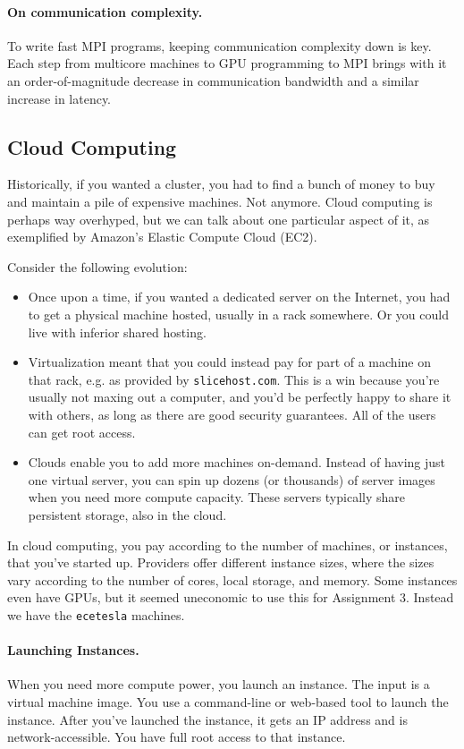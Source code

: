 \paragraph{On communication complexity.} To write fast MPI programs,
keeping communication complexity down is key. Each step from multicore
machines to GPU programming to MPI brings with it an
order-of-magnitude decrease in communication bandwidth and a similar
increase in latency.

\subsection*{Cloud Computing}
Historically, if you wanted a cluster, you had to find a bunch of
money to buy and maintain a pile of expensive machines. Not anymore.
Cloud computing is perhaps way overhyped, but we can talk about 
one particular aspect of it, as exemplified by Amazon's Elastic
Compute Cloud (EC2).

Consider the following evolution:
\begin{itemize}
\item Once upon a time, if you wanted a dedicated server on the
  Internet, you had to get a physical machine hosted, usually in a
  rack somewhere. Or you could live with inferior shared hosting.
\item Virtualization meant that you could instead pay for part of a
  machine on that rack, e.g. as provided by {\tt slicehost.com}.  This
  is a win because you're usually not maxing out a computer, and you'd
  be perfectly happy to share it with others, as long as there are
  good security guarantees. All of the users can get root access.
\item Clouds enable you to add more machines on-demand. Instead of
  having just one virtual server, you can spin up dozens (or
  thousands) of server images when you need more compute
  capacity. These servers typically share persistent storage, also in
  the cloud. 
\end{itemize}

In cloud computing, you pay according to the number of machines, or
instances, that you've started up. Providers offer different instance
sizes, where the sizes vary according to the number of cores, local
storage, and memory. Some instances even have GPUs, but it seemed 
uneconomic to use this for Assignment 3. Instead we have the {\tt ecetesla} machines.

\paragraph{Launching Instances.} When you need more compute power,
you launch an instance. The input is a virtual machine image.  You use
a command-line or web-based tool to launch the instance.  After you've
launched the instance, it gets an IP address and is
network-accessible. You have full root access to that instance.

